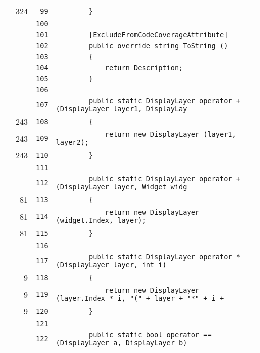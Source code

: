 \documentclass[a4paper,10pt]{article}
\begin{document}
\begin{longtable}[l]{lrrl}
\cellcolor{green} & 324 & \verb~99~ & \verb~        }~\\
\cellcolor{gray} &  & \verb~100~ & \verb~~\\
\cellcolor{gray} &  & \verb~101~ & \verb~        [ExcludeFromCodeCoverageAttribute]~\\
\cellcolor{gray} &  & \verb~102~ & \verb~        public override string ToString ()~\\
\cellcolor{gray} &  & \verb~103~ & \verb~        {~\\
\cellcolor{gray} &  & \verb~104~ & \verb~            return Description;~\\
\cellcolor{gray} &  & \verb~105~ & \verb~        }~\\
\cellcolor{gray} &  & \verb~106~ & \verb~~\\
\cellcolor{gray} &  & \verb~107~ & \verb~        public static DisplayLayer operator + (DisplayLayer layer1, DisplayLay~\\
\cellcolor{green} & 243 & \verb~108~ & \verb~        {~\\
\cellcolor{green} & 243 & \verb~109~ & \verb~            return new DisplayLayer (layer1, layer2);~\\
\cellcolor{green} & 243 & \verb~110~ & \verb~        }~\\
\cellcolor{gray} &  & \verb~111~ & \verb~~\\
\cellcolor{gray} &  & \verb~112~ & \verb~        public static DisplayLayer operator + (DisplayLayer layer, Widget widg~\\
\cellcolor{green} & 81 & \verb~113~ & \verb~        {~\\
\cellcolor{green} & 81 & \verb~114~ & \verb~            return new DisplayLayer (widget.Index, layer);~\\
\cellcolor{green} & 81 & \verb~115~ & \verb~        }~\\
\cellcolor{gray} &  & \verb~116~ & \verb~~\\
\cellcolor{gray} &  & \verb~117~ & \verb~        public static DisplayLayer operator * (DisplayLayer layer, int i)~\\
\cellcolor{green} & 9 & \verb~118~ & \verb~        {~\\
\cellcolor{green} & 9 & \verb~119~ & \verb~            return new DisplayLayer (layer.Index * i, "(" + layer + "*" + i + ~\\
\cellcolor{green} & 9 & \verb~120~ & \verb~        }~\\
\cellcolor{gray} &  & \verb~121~ & \verb~~\\
\cellcolor{gray} &  & \verb~122~ & \verb~        public static bool operator == (DisplayLayer a, DisplayLayer b)~\\

\end{longtable}
\end{document}
